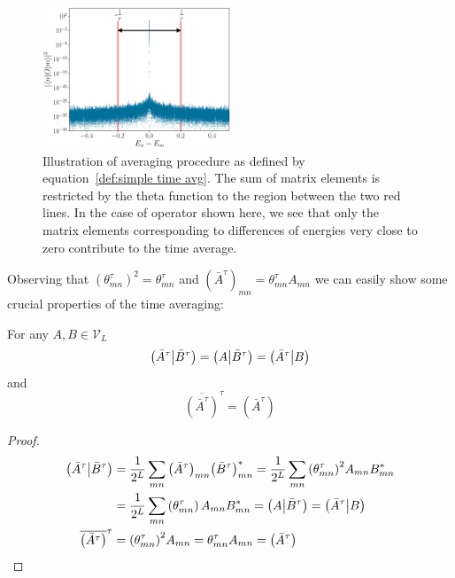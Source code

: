 \begin{figure}[htbp]
  \centering
  \includegraphics[width=0.5\textwidth]{Figures/cutoff_flat.pdf}
  \caption{Illustration of averaging procedure as defined by equation~\eqref{def:simple time avg}. The sum
  of matrix elements is restricted by the theta function to the region between the two red lines. In the case
  of operator shown here, we see that only the matrix elements corresponding to differences of energies
  very close to zero contribute to the time average. }
  \label{fig:cutoff}
\end{figure}


Observing that \({\left(\theta_{mn}^{\tau}\right)}^2 = \theta_{mn}^{\tau}\) and \({\left(\bar{A}^{\tau}\right)}_{mn} =
\theta_{mn}^{\tau} A_{mn}\) we can easily show some crucial properties of the time averaging:
\begin{proposition}
  For any \(A,B \in \mathcal{V}_L\)
  \begin{equation*}
    \left(\bar{A}^{\tau} \middle| \bar{B}^{\tau}\right) = \left(A \middle| \bar{B}^{\tau}\right) = \left(\bar{A}^{\tau} \middle| B\right)
  \end{equation*}
  and
  \begin{equation*}
    \overline{\left(\bar{A}^{\tau}\right)}^{\tau} = \left(\bar{A}^{\tau}\right)
  \end{equation*}
  \label{prop:projection}
\end{proposition}

\begin{proof}
  \begin{align*}
    \left(\bar{A}^{\tau} \middle| \bar{B}^{\tau}\right)  & = \frac{1}{2^L} \sum_{mn} {\left(\bar{A}^{\tau}\right)}_{mn}
    {\left(\bar{B}^{\tau}\right)}_{mn}^{\ast} = \frac{1}{2^L} \sum_{mn} {\left(\theta_{mn}^{\tau}\right)}^2 A_{mn} B_{mn}^{\ast} \nonumber{}               \\
    & = \frac{1}{2^L} \sum_{mn} \left(\theta_{mn}^{\tau}\right) A_{mn} B_{mn}^{\ast} =
    \left(A \middle| \bar{B}^{\tau}\right) = \left(\bar{A}^{\tau} \middle| B\right)                                                                                                        \\
    \overline{\left(\bar{A}^{\tau}\right)}^{\tau} & = {\left(\theta_{mn}^{\tau}\right)}^2 A_{mn} = \theta_{mn}^{\tau} A_{mn} = \left(\bar{A}^{\tau}\right)
  \end{align*}
  
\end{proof}


